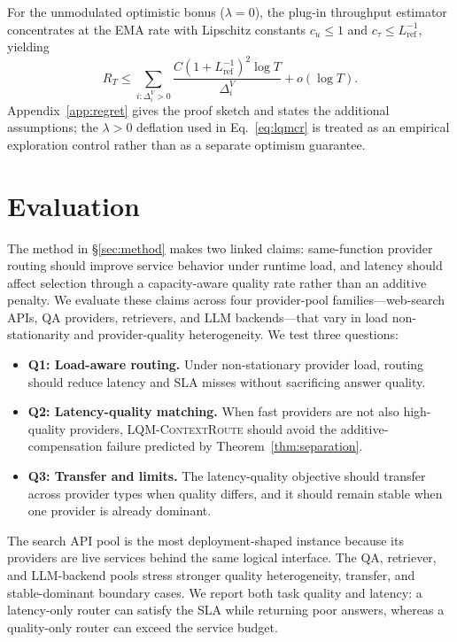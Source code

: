 \documentclass[11pt]{article}
\newcommand{\lqmcr}{\textsc{LQM-ContextRoute}}
\begin{document}
For the unmodulated optimistic bonus ($\lambda=0$), the plug-in throughput estimator concentrates at the EMA rate with Lipschitz constants $c_u\leq1$ and $c_\tau\leq L_{\text{ref}}^{-1}$, yielding
\[
  R_T \leq \sum_{i:\Delta_i^V > 0}
    \frac{C(1 + L_{\text{ref}}^{-1})^2 \log T}{\Delta_i^V} + o(\log T).
\]
Appendix~\ref{app:regret} gives the proof sketch and states the additional assumptions; the $\lambda>0$ deflation used in Eq.~\ref{eq:lqmcr} is treated as an empirical exploration control rather than as a separate optimism guarantee.

\section{Evaluation}
\label{sec:eval}

The method in \S\ref{sec:method} makes two linked claims: same-function provider routing should improve service behavior under runtime load, and latency should affect selection through a capacity-aware quality rate rather than an additive penalty. We evaluate these claims across four provider-pool families---web-search APIs, QA providers, retrievers, and LLM backends---that vary in load non-stationarity and provider-quality heterogeneity. We test three questions:
\begin{itemize}
\setlength{\itemsep}{0pt}
\item \textbf{Q1: Load-aware routing.} Under non-stationary provider load, routing should reduce latency and SLA misses without sacrificing answer quality.
\item \textbf{Q2: Latency-quality matching.} When fast providers are not also high-quality providers, \lqmcr{} should avoid the additive-compensation failure predicted by Theorem~\ref{thm:separation}.
\item \textbf{Q3: Transfer and limits.} The latency-quality objective should transfer across provider types when quality differs, and it should remain stable when one provider is already dominant.
\end{itemize}
The search API pool is the most deployment-shaped instance because its providers are live services behind the same logical interface. The QA, retriever, and LLM-backend pools stress stronger quality heterogeneity, transfer, and stable-dominant boundary cases. We report both task quality and latency: a latency-only router can satisfy the SLA while returning poor answers, whereas a quality-only router can exceed the service budget.
\end{document}

